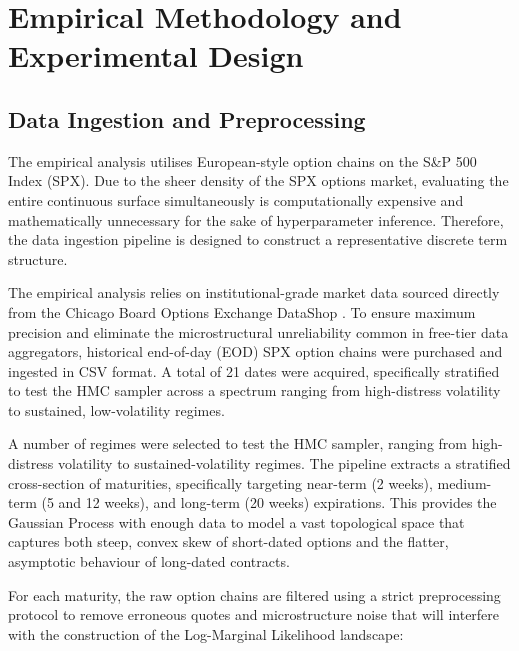 \documentclass[12pt,oneside]{report}
\theoremstyle{definition}
\theoremstyle{remark}
\begin{document}
\chapter{Empirical Methodology and Experimental Design}

\section{Data Ingestion and Preprocessing}
The empirical analysis utilises European-style option chains on the S\&P 500 Index (SPX). Due to the sheer density of the SPX options market, evaluating the entire continuous surface simultaneously is computationally expensive and mathematically unnecessary for the sake of hyperparameter inference. Therefore, the data ingestion pipeline is designed to construct a representative discrete term structure.

The empirical analysis relies on institutional-grade market data sourced directly from the Chicago Board Options Exchange DataShop \cite{cboe2026datashop}. To ensure maximum precision and eliminate the microstructural unreliability common in free-tier data aggregators, historical end-of-day (EOD) SPX option chains were purchased and ingested in CSV format. A total of 21 dates were acquired, specifically stratified to test the HMC sampler across a spectrum ranging from high-distress volatility to sustained, low-volatility regimes.

A number of regimes were selected to test the HMC sampler, ranging from high-distress volatility to sustained-volatility regimes. The pipeline extracts a stratified cross-section of maturities, specifically targeting near-term (2 weeks), medium-term (5 and 12 weeks), and long-term (20 weeks) expirations. This provides the Gaussian Process with enough data to model a vast topological space that captures both steep, convex skew of short-dated options and the flatter, asymptotic behaviour of long-dated contracts. 

For each maturity, the raw option chains are filtered using a strict preprocessing protocol to remove erroneous quotes and microstructure noise that will interfere with the construction of the Log-Marginal Likelihood landscape:
\end{document}
